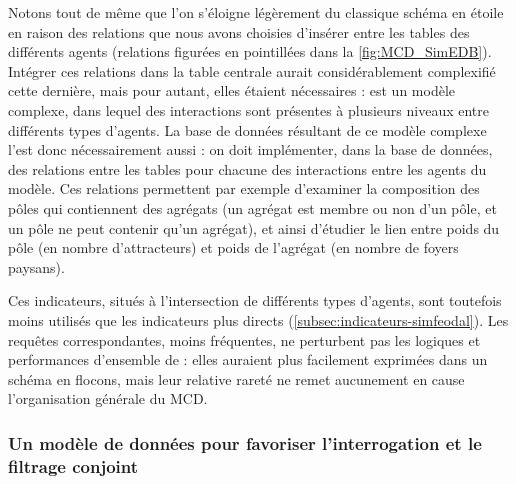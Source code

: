 Notons tout de même que l'on s'éloigne légèrement du classique schéma en étoile en raison des relations que nous avons choisies d'insérer entre les tables des différents agents (relations figurées en pointillées dans la \cref{fig:MCD_SimEDB}).
Intégrer ces relations dans la table centrale aurait considérablement complexifié cette dernière, mais pour autant, elles étaient nécessaires : \simfeodal{} est un modèle complexe, dans lequel des interactions sont présentes à plusieurs niveaux entre différents types d'agents.
La base de données résultant de ce modèle complexe l'est donc nécessairement aussi : on doit implémenter, dans la base de données, des relations entre les tables pour chacune des interactions entre les agents du modèle.
Ces relations permettent par exemple d'examiner la composition des pôles qui contiennent des agrégats (un agrégat est membre ou non d'un pôle, et un pôle ne peut contenir qu'un agrégat), et ainsi d'étudier le lien entre poids du pôle (en nombre d'attracteurs) et poids de l'agrégat (en nombre de foyers paysans).

Ces indicateurs, situés à l'intersection de différents types d'agents, sont toutefois moins utilisés que les indicateurs plus directs (\cref{subsec:indicateurs-simfeodal}).
Les requêtes correspondantes, moins fréquentes, ne perturbent pas les logiques et performances d'ensemble de \simedb{} : elles auraient plus facilement exprimées dans un schéma \og en flocons\fg{}, mais leur relative rareté ne remet aucunement en cause l'organisation générale du MCD.


\subsubsection{Un modèle de données pour favoriser l'interrogation et le filtrage conjoint}

